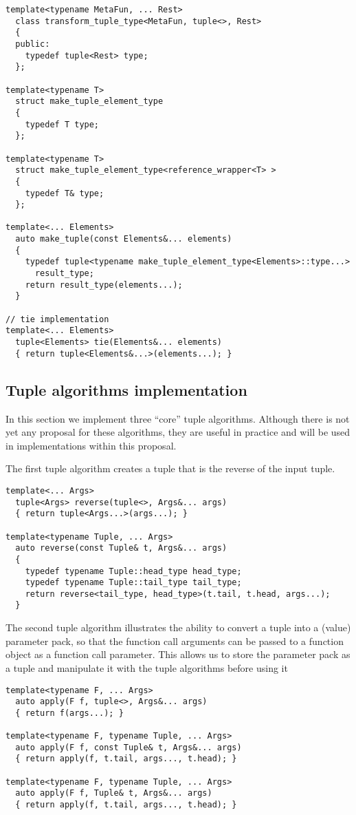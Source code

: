 \documentclass{article}
\begin{document}
\begin{verbatim}
template<typename MetaFun, ... Rest>
  class transform_tuple_type<MetaFun, tuple<>, Rest>
  {
  public:
    typedef tuple<Rest> type;
  };

template<typename T>
  struct make_tuple_element_type
  {
    typedef T type;
  };

template<typename T>
  struct make_tuple_element_type<reference_wrapper<T> >
  {
    typedef T& type;
  };

template<... Elements> 
  auto make_tuple(const Elements&... elements)
  {
    typedef tuple<typename make_tuple_element_type<Elements>::type...>
      result_type;
    return result_type(elements...);
  }

// tie implementation
template<... Elements>
  tuple<Elements> tie(Elements&... elements)
  { return tuple<Elements&...>(elements...); }
\end{verbatim}
\normalsize

\subsection{Tuple algorithms implementation}
In this section we implement three ``core'' tuple algorithms.
Although there is not yet any proposal for these algorithms, they are
useful in practice and will be used in implementations within this
proposal.

The first tuple algorithm creates a tuple that is the reverse of the
input tuple.
\begin{verbatim}
template<... Args>
  tuple<Args> reverse(tuple<>, Args&... args)
  { return tuple<Args...>(args...); }

template<typename Tuple, ... Args>
  auto reverse(const Tuple& t, Args&... args)
  { 
    typedef typename Tuple::head_type head_type;
    typedef typename Tuple::tail_type tail_type;
    return reverse<tail_type, head_type>(t.tail, t.head, args...);
  }
\end{verbatim}

The second tuple algorithm illustrates the ability to convert a tuple into
a (value) parameter pack, so that the function call arguments can be passed
to a function object as a function call parameter. This allows us to store
the parameter pack as a tuple and manipulate it with the tuple algorithms
before using it
\begin{verbatim}
template<typename F, ... Args>
  auto apply(F f, tuple<>, Args&... args)
  { return f(args...); }

template<typename F, typename Tuple, ... Args>
  auto apply(F f, const Tuple& t, Args&... args)
  { return apply(f, t.tail, args..., t.head); }

template<typename F, typename Tuple, ... Args>
  auto apply(F f, Tuple& t, Args&... args)
  { return apply(f, t.tail, args..., t.head); }
\end{verbatim}
\end{document}
